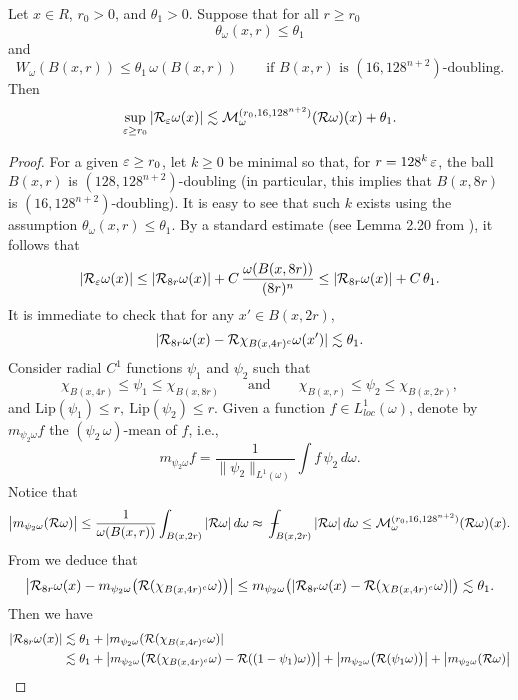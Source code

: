 \vv

\begin{lemma}\label{lemcotlar1}
Let $x\in R$, $r_0>0$, and $\theta_1>0$.
Suppose that for all $r\geq r_0$ 
$$\theta_\omega(x,r)\leq \theta_1$$
and 
$$W_\omega(B(x,r))\leq \theta_1\,\omega(B(x,r))\qquad \mbox{if $B(x,r)$ is $(16,128^{n+2})$-doubling.}$$
Then
\begin{equation}\label{eqcot99}
\sup_{{\varepsilon}\geq r_0} |{\mathcal R}_{\varepsilon}\omega(x)|\lesssim {\mathcal M}_\omega^{(r_0,16,128^{n+2})}({\mathcal R}\omega)(x) + \theta_1.
\end{equation}
\end{lemma}

\begin{proof}
For a given ${\varepsilon}\geq r_0$, let $k\geq0$ be minimal so that, for $r=128^k\,{\varepsilon}$, the ball $B(x,r)$ is $(128,128^{n+2})$-doubling (in particular, this implies that $B(x,8r)$ is $(16,128^{n+2})$-doubling). It is easy to see that such $k$ exists using the assumption $\theta_\omega(x,r)\leq \theta_1$.
By a standard estimate (see Lemma 2.20 from \cite{Tolsa-llibre}), it follows that
$$|{\mathcal R}_{\varepsilon} \omega(x)|\leq |{\mathcal R}_{8r} \omega(x)| + C\,\frac{\omega(B(x,8r))}{(8r)^n} \leq |{\mathcal R}_{8r} \omega(x)| + C\,\theta_1.$$
It is immediate to check that for any $x'\in B(x,2r)$,
\begin{equation}\label{eqss1}
|{\mathcal R}_{8r}\omega(x) - {\mathcal R}\chi_{B(x,4r)^c}\omega(x')|\lesssim \theta_1.
\end{equation}
Consider radial $C^1$ functions $\psi_1$ and $\psi_2$ such that
$$\chi_{B(x,4r)}\leq \psi_1\leq \chi_{B(x,8r)}\qquad \text{and} \qquad
\chi_{B(x,r)}\leq \psi_2\leq \chi_{B(x,2r)},$$
and $\text{Lip}(\psi_1)\le r,\ \text{Lip}(\psi_2)\le r.$ Given a function $f\in L^1_{loc}(\omega)$, denote by $m_{\psi_2\omega}f$ the $(\psi_2\,\omega)$-mean of $f$, i.e.,
$$m_{\psi_2\omega}f = \frac1{\|\psi_2\|_{L^1(\omega)}} \int f\,\psi_2\,d\omega.$$
Notice that
$$\bigl|m_{\psi_2\omega}(\RR\omega)\bigr|\leq \frac1{\omega(B(x,r))} \int_{B(x,2r)}
|\RR\omega|\,d\omega \approx\avint_{B(x,2r)}
|\RR\omega|\,d\omega 
\leq \cM_\omega^{(r_0,16,128^{n+2})}(\RR\omega)(x).$$
From  we deduce that
$$\big|{\mathcal R}_{8r}\omega(x) - m_{\psi_2\omega}\bigl({\mathcal R}(\chi_{B(x,4r)^c}\omega)\bigr)\big| \leq m_{\psi_2\omega}\bigl(|{\mathcal R}_{8r}\omega(x) - {\mathcal R}(\chi_{B(x,4r)^c}\omega)|\bigr)
\lesssim\theta_1.$$
Then we have
\begin{align*}
|\RR_{8r}\omega(x)|&\lesssim\theta_1 + |m_{\psi_2\omega}(\RR(\chi_{B(x,4r)^c}\omega)|\\
& \lesssim\theta_1 + \bigl|m_{\psi_2\omega}\bigl(\RR(\chi_{B(x,4r)^c}\omega) - \RR((1-\psi_1)\omega)\bigr)\bigr| +\bigl|m_{\psi_2\omega}\bigl(\RR(\psi_1\omega)\bigr)\bigr|+ \bigl|m_{\psi_2\omega}(\RR\omega)\bigr|\\

\end{align*}
\end{proof}
